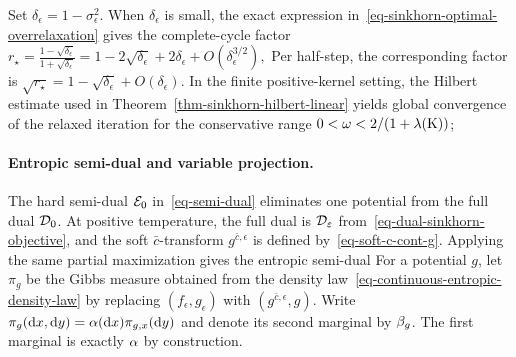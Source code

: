 Set $\delta_\epsilon=1-\sigma_\epsilon^2$. When $\delta_\epsilon$ is small, the exact expression in~\eqref{eq-sinkhorn-optimal-overrelaxation} gives the complete-cycle factor
\(r_\star = \frac{1-\sqrt{\delta_\epsilon}}{1+\sqrt{\delta_\epsilon}} = 1-2\sqrt{\delta_\epsilon} +2\delta_\epsilon +O(\delta_\epsilon^{3/2}),\)
Per half-step, the corresponding factor is
\(
\sqrt{r_\star}=1-\sqrt{\delta_\epsilon}+O(\delta_\epsilon)
\).
In the finite positive-kernel setting, the Hilbert estimate used in Theorem~\ref{thm-sinkhorn-hilbert-linear} yields global convergence of the relaxed iteration for the conservative range
\(
0<\omega<2/(1+\lambda(\mathrm{K}))
\);
\paragraph{Entropic semi-dual and variable projection.}
The hard semi-dual \(\mathcal{E}_0\) in~\eqref{eq-semi-dual} eliminates one potential from the full dual \(\mathcal{D}_0\). At positive temperature, the full dual is \(\mathcal{D}_\varepsilon\) from~\eqref{eq-dual-sinkhorn-objective}, and the soft \(\bar c\)-transform \(g^{\bar c,\epsilon}\) is defined by~\eqref{eq-soft-c-cont-g}. Applying the same partial maximization gives the entropic semi-dual
For a potential $g$, let $\pi_g$ be the Gibbs measure obtained from the density law~\eqref{eq-continuous-entropic-density-law} by replacing $(f_\epsilon,g_\epsilon)$ with $(g^{\bar c,\epsilon},g)$. Write
\(
\pi_g(\mathrm{d} x,\mathrm{d} y)=\alpha(\mathrm{d} x)\pi_{g,x}(\mathrm{d} y)
\)
and denote its second marginal by $\beta_g$. The first marginal is exactly $\alpha$ by construction.

